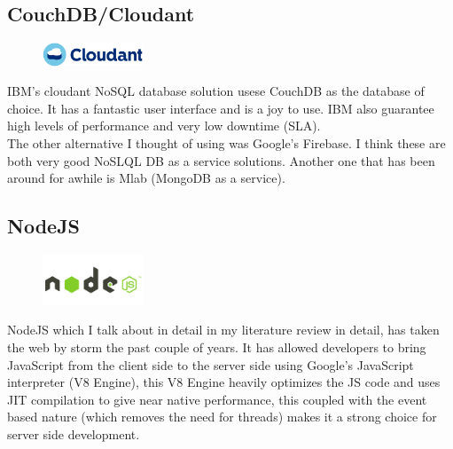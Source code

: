 \subsection{CouchDB/Cloudant}
\begin{figure}
\includegraphics[width=3cm]{img/mobile-app/logos/cloudant.jpg}
\end{figure} 
IBM's cloudant \cite{cloudant} NoSQL database solution usese CouchDB \cite{couchdb} as the database of choice.
It has a fantastic user interface and is a joy to use.
IBM also guarantee high levels of performance and very low downtime (SLA).
\\

The other alternative I thought of using was Google's Firebase.
I think these are both very good NoSLQL DB as a service solutions.
Another one that has been around for awhile is Mlab (MongoDB as a service).

\subsection{NodeJS}
\begin{figure}
\includegraphics[width=3cm]{img/mobile-app/logos/nodejs.png}
\end{figure} 
NodeJS \cite{nodejs} which I talk about in detail in my literature review \cite{js_advantages_full_stack} in detail, has taken the web by storm the past couple of years. It has allowed developers to bring JavaScript from the client side to the server side using Google's JavaScript interpreter (V8 Engine), this V8 Engine heavily optimizes the JS code and uses JIT compilation to give near native performance, this coupled with the event based nature (which removes the need for threads) makes it a strong choice for server side development.


